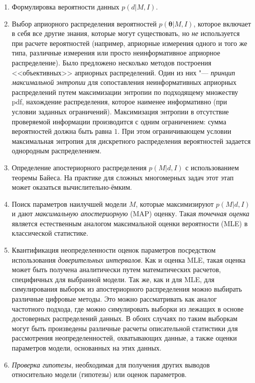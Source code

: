 \begin{enumerate}
    \item Формулировка вероятности данных $p(d|M, I)$.
    \item Выбор априорного распределения вероятностей $p(\boldsymbol{\theta}|M,I)$, которое включает в себя все 
            другие знания, которые могут существовать, но \textit{не} используется при расчете вероятностей (например, 
            априорные измерения одного и того же типа, различные измерения или просто неинформативное априорное 
            распределение). Было предложено несколько методов построения <<объективных>> априорных распределений. Один из 
            них "--- \textit{принцип максимальной энтропии} для сопоставления неинформативных априорных распределений 
            путем максимизации энтропии по подходящему множеству pdf, нахождение распределения, которое наименее 
            информативно (при условии заданных ограничений). Максимизация энтропии в отсутствие проверяемой информации 
            производится с одним ограничением: сумма вероятностей должна быть равна $1$. При этом ограничивающем 
            условии максимальная энтропия для дискретного распределения вероятностей задается однородным распределением.
    \item Определение апостериорного распределения $p(M|d, I)$ с использованием теоремы Байеса. На практике для сложных 
            многомерных задач этот этап может оказаться вычислительно-ёмким.
    \item Поиск параметров наилучшей модели $M$, которые максимизируют $p(M|d, I)$ и дают \textit{максимальную 
            апостериорную} (MAP) оценку. Такая \textit{точечная оценка} является естественным аналогом максимальной 
            оценки вероятности (MLE) в классической статистике.
    \item Квантификация неопределенности оценок параметров посредством использования \textit{доверительных интервалов}. 
            Как и оценка MLE, такая оценка может быть получена аналитически путем математических расчетов, специфичных 
            для выбранной модели. Так же, как и для MLE, для симулирования выборок из апостериорного распределения 
            можно выбирать различные цифровые методы. Это можно рассматривать как аналог частотного подхода, где можно 
            симулировать выборки из лежащих в основе достоверных распределений данных. В обоих случаях по таким 
            выборкам могут быть произведены различные расчеты описательной статистики для рассмотрения 
            неопределенностей, охватывающих данные, а также оценки параметров модели, основанных на этих данных.
    \item \textit{Проверка гипотезы}, необходимая для получения других выводов относительно 
            модели (гипотезы) или оценок параметров.
\end{enumerate}


